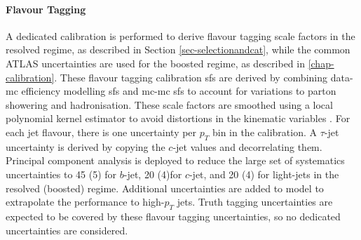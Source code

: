 \paragraph{Flavour Tagging} A dedicated calibration is performed to derive flavour tagging scale factors in the resolved regime, as described in Section \ref{sec-selectionandcat}, while the common ATLAS uncertainties are used for the boosted regime, as described in \ref{chap-calibration}. These flavour tagging calibration \gls{sf}s are derived by combining data-\gls{mc} efficiency modelling \gls{sf}s and \gls{mc}-\gls{mc} \gls{sf}s to account for variations to parton showering and hadronisation. These scale factors are smoothed using a local polynomial kernel estimator to avoid distortions in the kinematic variables \cite{ATL-PHYS-PUB-2020-004}. For each jet flavour, there is one uncertainty per $p_T$ bin in the calibration. A $\tau$-jet uncertainty is derived by copying the $c$-jet values and decorrelating them. Principal component analysis is deployed to reduce the large set of systematics uncertainties to 45 (5) for $b$-jet, 20 (4)for $c$-jet, and 20 (4) for light-jets in the resolved (boosted) regime. Additional uncertainties are added to model to extrapolate the performance to high-$p_T$ jets. Truth tagging uncertainties are expected to be covered by these flavour tagging uncertainties, so no dedicated uncertainties are considered.

